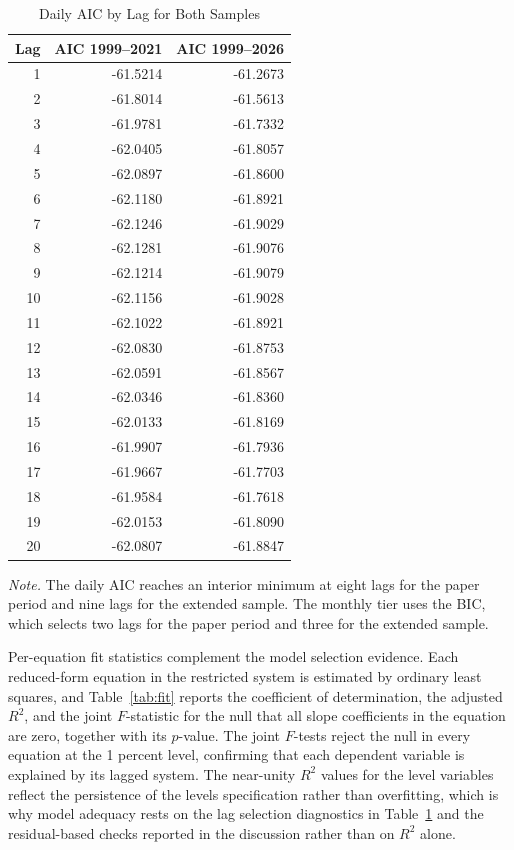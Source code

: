 \FloatBarrier
\begin{table}[H]
  \centering
  \caption{Daily AIC by Lag for Both Samples}
  \label{tab:aic}
  \small
  \begin{tabular}{r r r}
    \toprule
    Lag & AIC 1999--2021 & AIC 1999--2026 \\
    \midrule
1 & -61.5214 & -61.2673 \\
2 & -61.8014 & -61.5613 \\
3 & -61.9781 & -61.7332 \\
4 & -62.0405 & -61.8057 \\
5 & -62.0897 & -61.8600 \\
6 & -62.1180 & -61.8921 \\
7 & -62.1246 & -61.9029 \\
8 & -62.1281 & -61.9076 \\
9 & -62.1214 & -61.9079 \\
10 & -62.1156 & -61.9028 \\
11 & -62.1022 & -61.8921 \\
12 & -62.0830 & -61.8753 \\
13 & -62.0591 & -61.8567 \\
14 & -62.0346 & -61.8360 \\
15 & -62.0133 & -61.8169 \\
16 & -61.9907 & -61.7936 \\
17 & -61.9667 & -61.7703 \\
18 & -61.9584 & -61.7618 \\
19 & -62.0153 & -61.8090 \\
20 & -62.0807 & -61.8847 \\
    \bottomrule
  \end{tabular}
\end{table}
\FloatBarrier

\begin{center}
  \small\textit{Note.} The daily AIC reaches an interior minimum at eight lags for the paper period and nine lags for the extended sample. The monthly tier uses the BIC, which selects two lags for the paper period and three for the extended sample.
\end{center}

Per-equation fit statistics complement the model selection evidence. Each reduced-form equation in the restricted system is estimated by ordinary least squares, and Table~\ref{tab:fit} reports the coefficient of determination, the adjusted $R^2$, and the joint $F$-statistic for the null that all slope coefficients in the equation are zero, together with its $p$-value. The joint $F$-tests reject the null in every equation at the 1 percent level, confirming that each dependent variable is explained by its lagged system. The near-unity $R^2$ values for the level variables reflect the persistence of the levels specification rather than overfitting, which is why model adequacy rests on the lag selection diagnostics in Table~\ref{tab:aic} and the residual-based checks reported in the discussion rather than on $R^2$ alone.

